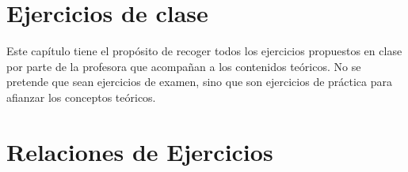 \documentclass[12pt]{book}
\begin{document}

    

    \fancyhead[R]{\helv \nouppercase{\rightmark}}
    \chapter{Ejercicios de clase}
    \noindent
    Este capítulo tiene el propósito de recoger todos los ejercicios propuestos en clase por parte de la profesora que acompañan a los contenidos teóricos. No se pretende que sean ejercicios de examen, sino que son ejercicios de práctica para afianzar los conceptos teóricos.\\
    
    
    
    
    
    
    
    
    \chapter{Relaciones de Ejercicios}
    
    
    
    
    
    
\end{document}
